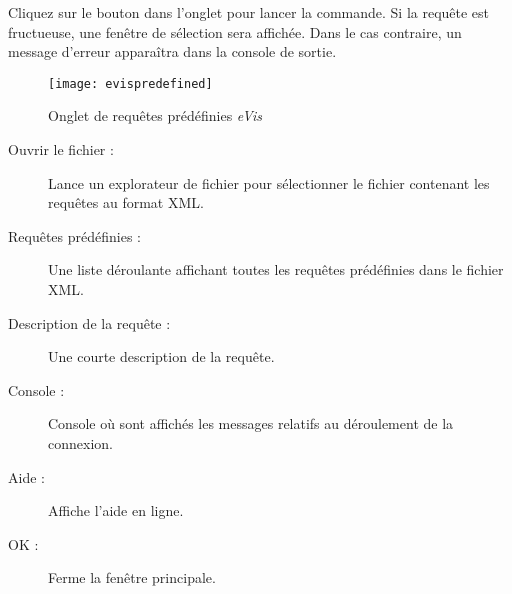 Cliquez sur le bouton  dans l'onglet  pour lancer la commande. Si la requête est fructueuse, une fenêtre de sélection sera affichée. Dans le cas contraire, un message d'erreur apparaîtra dans la console de sortie.


\begin{figure}[ht]
   \begin{center}
\texttt{[image: evispredefined]}
\caption{\label{evispredefined}Onglet de requêtes prédéfinies \emph{eVis} \nixcaption}
\end{center}
\end{figure}


\begin{description}
\item[Ouvrir le fichier :] Lance un explorateur de fichier pour sélectionner le fichier contenant les requêtes au format XML.
\item[Requêtes prédéfinies :] Une liste déroulante affichant toutes les requêtes prédéfinies dans le fichier XML.
\item[Description de la requête :] Une courte description de la requête.
\item[Console :] Console où sont affichés les messages relatifs au déroulement de la connexion.
\item[Aide :] Affiche l'aide en ligne.
\item[OK :] Ferme la fenêtre principale.
\end{description}

